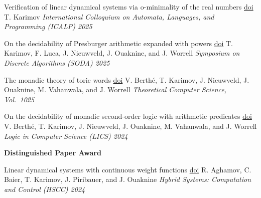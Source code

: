 \documentclass{article}
\begin{document}
\begin{etaremune}
		\item
		{\large *Verification of linear dynamical systems via o-minimality of the real numbers}
		\quad
		\href{https://doi.org/10.4230/LIPIcs.ICALP.2025.163}{doi}%
		\vspace*{0.2cm}\newline
		T. Karimov
		\vspace*{0.25cm}\newline
		\emph{International Colloquium on Automata, Languages, and Programming (ICALP) 2025}
		\vspace{0.2cm}
		
		\item 
		{\large On the decidability of Presburger arithmetic expanded with powers}
		\quad \href{https://doi.org/10.1137/1.9781611978322.89}{doi}
		\vspace*{0.2cm}\newline
		T. Karimov, F. Luca, J. Nieuwveld, J. Ouaknine, and J. Worrell
		\vspace*{0.25cm}\newline
		\emph{Symposium on Discrete Algorithms (SODA) 2025}
		\vspace{0.2cm}
		
		\item
		{\large *The monadic theory of toric words}
		\quad \href{https://doi.org/10.1016/j.tcs.2024.114959}{doi}
		\vspace*{0.2cm}\newline
		V. Berth\'e, T. Karimov, J. Nieuwveld, J. Ouaknine, M. Vahanwala, and J. Worrell
		\vspace*{0.25cm}\newline
		\emph{Theoretical Computer Science, Vol.\ 1025}
		\vspace*{0.2cm}
		
		\item{\large On the decidability of monadic second-order logic with arithmetic predicates}  
		\quad
		\href{https://doi.org/10.1145/3661814.3662119}{doi}
		\vspace*{0.2cm}
		\newline
		V. Berth\'e, T. Karimov, J. Nieuwveld, J. Ouaknine, M. Vahanwala, and J. Worrell
		\vspace*{0.25cm}\newline
		\emph{Logic in Computer Science (LICS) 2024} 
		
		\textbf{Distinguished Paper Award} 
		\vspace*{0.2cm}
		
		\item 
		{\large *Linear dynamical systems with continuous weight functions}
		\quad
		\href{https://doi.org/10.1145/3641513.3650173}{doi}
		\vspace*{0.2cm}
		\newline
		R. Aghamov, C. Baier, T. Karimov, J. Piribauer, and J. Ouaknine
		\vspace*{0.25cm}\newline
		\emph{Hybrid Systems: Computation and Control (HSCC) 2024} 
		

\end{etaremune}
\end{document}
